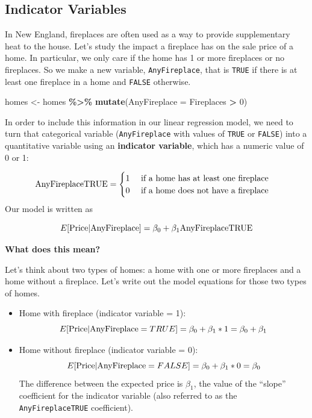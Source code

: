 \documentclass[
]{book}
\newenvironment{Shaded}{\begin{snugshade}}{\end{snugshade}}
\newcommand{\AttributeTok}[1]{\textcolor[rgb]{0.13,0.29,0.53}{#1}}
\newcommand{\DecValTok}[1]{\textcolor[rgb]{0.00,0.00,0.81}{#1}}
\newcommand{\FunctionTok}[1]{\textcolor[rgb]{0.13,0.29,0.53}{\textbf{#1}}}
\newcommand{\NormalTok}[1]{#1}
\newcommand{\OtherTok}[1]{\textcolor[rgb]{0.56,0.35,0.01}{#1}}
\newcommand{\SpecialCharTok}[1]{\textcolor[rgb]{0.81,0.36,0.00}{\textbf{#1}}}
\begin{document}
\subsection{Indicator Variables}\label{indicator-variables}

In New England, fireplaces are often used as a way to provide supplementary heat to the house. Let's study the impact a fireplace has on the sale price of a home. In particular, we only care if the home has 1 or more fireplaces or no fireplaces. So we make a new variable, \texttt{AnyFireplace}, that is \texttt{TRUE} if there is at least one fireplace in a home and \texttt{FALSE} otherwise.

\begin{Shaded}
\begin{Highlighting}[]
\NormalTok{homes }\OtherTok{\textless{}{-}}\NormalTok{ homes }\SpecialCharTok{\%\textgreater{}\%}
    \FunctionTok{mutate}\NormalTok{(}\AttributeTok{AnyFireplace =}\NormalTok{ Fireplaces }\SpecialCharTok{\textgreater{}} \DecValTok{0}\NormalTok{)}
\end{Highlighting}
\end{Shaded}

In order to include this information in our linear regression model, we need to turn that categorical variable (\texttt{AnyFireplace} with values of \texttt{TRUE} or \texttt{FALSE}) into a quantitative variable using an \textbf{indicator variable}, which has a numeric value of 0 or 1:

\[ \hbox{AnyFireplaceTRUE} = \begin{cases}1 \quad \text{ if a home has at least one fireplace}\\ 0\quad \text{ if a home does not have a fireplace} \end{cases}\]
Our model is written as

\[E[\hbox{Price} | \hbox{AnyFireplace}] = \beta_0 + \beta_1 \hbox{AnyFireplaceTRUE}\]

\textbf{What does this mean?}

Let's think about two types of homes: a home with one or more fireplaces and a home without a fireplace. Let's write out the model equations for those two types of homes.

\begin{itemize}
\item
  Home with fireplace (indicator variable = 1):\\
  \[E[\hbox{Price} | \hbox{AnyFireplace} = TRUE] = \beta_0 + \beta_1*1 = \beta_0+\beta_1\]
\item
  Home without fireplace (indicator variable = 0):\\
  \[E[\hbox{Price} | \hbox{AnyFireplace} = FALSE] = \beta_0 + \beta_1*0 = \beta_0\]
  The difference between the expected price is \(\beta_1\), the value of the ``slope'' coefficient for the indicator variable (also referred to as the \texttt{AnyFireplaceTRUE} coefficient).
\end{itemize}
\end{document}
